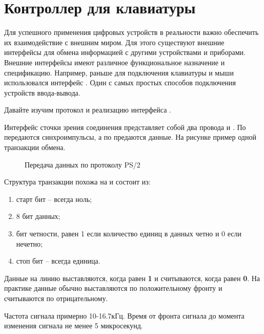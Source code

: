 \chapter{Контроллер  для клавиатуры}

\par{Для успешного применения цифровых устройств в реальности важно обеспечить их взаимодействие с внешним миром. Для этого существуют внешние интерфейсы для обмена информацией с другими устройствами и приборами. Внешние интерфейсы имеют различное функциональное назначение и спецификацию. Например, раньше для подключения клавиатуры и мыши использовался интерфейс . Один с самых простых способов подключения устройств ввода-вывода.}

\vspace{4mm}

\par{Давайте изучим протокол и реализацию интерфейса .}

\par{Интерфейс  сточки зрения соединения представляет собой два провода  и . По  передаются синхроимпульсы, а по  предаются данные. На рисунке пример одной транзакции обмена.}

\begin{figure}[H]
	\centering
	\def\svgwidth{10cm}
	
	\caption{Передача данных по протоколу PS/2}
\end{figure}

\par{Структура транзакции похожа на  и состоит из:}
  \begin{enumerate}%
    \item старт бит – всегда ноль;
    \item 8 бит данных;
    \item бит четности, равен 1 если количество единиц в данных четно и 0 если нечетно;
    \item стоп бит – всегда единица.
  \end{enumerate}

\par{Данные на линию выставляются, когда  равен \textbf{1} и считываются, когда  равен \textbf{0}. На практике данные обычно выставляются по положительному фронту и считываются по отрицательному.}

\par{Частота сигнала  примерно 10-16.7кГц. Время от фронта сигнала  до момента изменения сигнала  не менее 5 микросекунд.}

